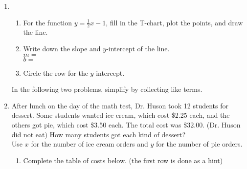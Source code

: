 \documentclass[12pt, oneside]{article}
\begin{document}
\begin{enumerate}
\newpage
\item
\begin{enumerate}
  \item For the function $y= \frac{1}{2}x-1$, fill in the T-chart, plot the points, and draw the line.
    \begin{center} %
    \end{center}
    \item Write down the slope and $y$-intercept of the line.\\[0.5cm]
    $m=$\\[0.5cm]
    $b=$\\[0.5cm]
    \item Circle the row for the $y$-intercept.
\end{enumerate}
\vspace{1cm}

In the following two problems, simplify by collecting like terms.

\newpage

  \item After lunch on the day of the math test, Dr. Huson took 12 students for dessert. Some students wanted ice cream, which cost \$2.25 each, and the others got pie, which cost \$3.50 each. The total cost was \$32.00. (Dr. Huson did not eat) How many students got each kind of dessert? \\[0.5cm]
  Use $x$ for the number of ice cream orders and $y$ for the number of pie orders.
  \begin{enumerate}
    \item Complete the table of costs below. (the first row is done as a hint)


\end{enumerate}
\end{enumerate}
\end{document}
